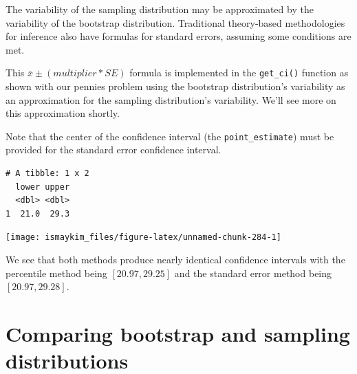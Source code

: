 \documentclass[12pt, krantz2,]{krantz}
\makeatletter
\newenvironment{Shaded}{\begin{snugshade}}{\end{snugshade}}
\newcommand{\DataTypeTok}[1]{\textcolor[rgb]{0.27,0.27,0.27}{#1}}
\newcommand{\KeywordTok}[1]{\textcolor[rgb]{0.27,0.27,0.27}{\textbf{#1}}}
\newcommand{\NormalTok}[1]{#1}
\newcommand{\OperatorTok}[1]{\textcolor[rgb]{0.43,0.43,0.43}{\textbf{#1}}}
\newcommand{\StringTok}[1]{\textcolor[rgb]{0.5,0.5,0.5}{#1}}
\newenvironment{kframe}{%
\medskip{}
\setlength{\fboxsep}{.8em}
 \def\at@end@of@kframe{}%
 \ifinner\ifhmode%
  \def\at@end@of@kframe{\end{minipage}}%
  \begin{minipage}{\columnwidth}%
 \fi\fi%
 \def\FrameCommand##1{\hskip\@totalleftmargin \hskip-\fboxsep
 \colorbox{shadecolor}{##1}\hskip-\fboxsep
     \hskip-\linewidth \hskip-\@totalleftmargin \hskip\columnwidth}%
 \MakeFramed {\advance\hsize-\width
   \@totalleftmargin\z@ \linewidth\hsize
   \@setminipage}}%
 {\par\unskip\endMakeFramed%
 \at@end@of@kframe}
\renewenvironment{Shaded}{\begin{kframe}}{\end{kframe}}
\makeatother
\begin{document}
The variability of the sampling distribution may be approximated by the variability of the bootstrap distribution. Traditional theory-based methodologies for inference also have formulas for standard errors, assuming some conditions are met.

This \(\bar{x} \pm (multiplier * SE)\) formula is implemented in the \texttt{get\_ci()} function as shown with our pennies problem using the bootstrap distribution's variability as an approximation for the sampling distribution's variability. We'll see more on this approximation shortly.

Note that the center of the confidence interval (the \texttt{point\_estimate}) must be provided for the standard error confidence interval.

\begin{Shaded}
\end{Shaded}

\begin{verbatim}
# A tibble: 1 x 2
  lower upper
  <dbl> <dbl>
1  21.0  29.3
\end{verbatim}

\begin{Shaded}
\end{Shaded}

\begin{center}\texttt{[image: ismaykim\_files/figure-latex/unnamed-chunk-284-1]} \end{center}

We see that both methods produce nearly identical confidence intervals with the percentile method being \([20.97, 29.25]\) and the standard error method being \([20.97, 29.28]\).

\hypertarget{comparing-bootstrap-and-sampling-distributions}{%
\section{Comparing bootstrap and sampling distributions}\label{comparing-bootstrap-and-sampling-distributions}}
\end{document}
